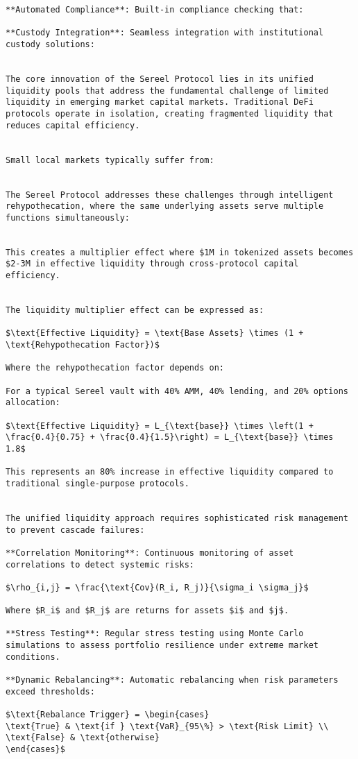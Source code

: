 \documentclass[12pt]{article}
\begin{document}
{{\begin{itemize}
\begin{lstlisting}
**Automated Compliance**: Built-in compliance checking that:

**Custody Integration**: Seamless integration with institutional custody solutions:


The core innovation of the Sereel Protocol lies in its unified liquidity pools that address the fundamental challenge of limited liquidity in emerging market capital markets. Traditional DeFi protocols operate in isolation, creating fragmented liquidity that reduces capital efficiency.


Small local markets typically suffer from:


The Sereel Protocol addresses these challenges through intelligent rehypothecation, where the same underlying assets serve multiple functions simultaneously:


This creates a multiplier effect where $1M in tokenized assets becomes $2-3M in effective liquidity through cross-protocol capital efficiency.


The liquidity multiplier effect can be expressed as:

$\text{Effective Liquidity} = \text{Base Assets} \times (1 + \text{Rehypothecation Factor})$

Where the rehypothecation factor depends on:

For a typical Sereel vault with 40% AMM, 40% lending, and 20% options allocation:

$\text{Effective Liquidity} = L_{\text{base}} \times \left(1 + \frac{0.4}{0.75} + \frac{0.4}{1.5}\right) = L_{\text{base}} \times 1.8$

This represents an 80% increase in effective liquidity compared to traditional single-purpose protocols.


The unified liquidity approach requires sophisticated risk management to prevent cascade failures:

**Correlation Monitoring**: Continuous monitoring of asset correlations to detect systemic risks:

$\rho_{i,j} = \frac{\text{Cov}(R_i, R_j)}{\sigma_i \sigma_j}$

Where $R_i$ and $R_j$ are returns for assets $i$ and $j$.

**Stress Testing**: Regular stress testing using Monte Carlo simulations to assess portfolio resilience under extreme market conditions.

**Dynamic Rebalancing**: Automatic rebalancing when risk parameters exceed thresholds:

$\text{Rebalance Trigger} = \begin{cases}
\text{True} & \text{if } \text{VaR}_{95\%} > \text{Risk Limit} \\
\text{False} & \text{otherwise}
\end{cases}$



\end{lstlisting}
\end{itemize}}}
\end{document}
